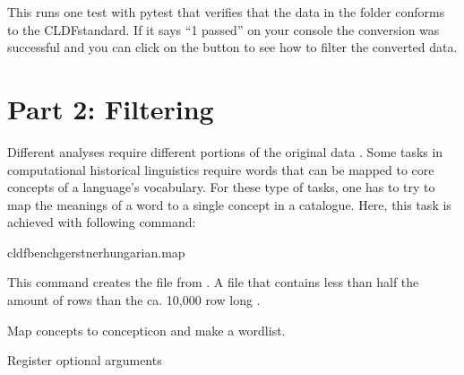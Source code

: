 \documentclass[letterpaper,10pt,english]{sphinxmanual}
\begin{document}
\sphinxAtStartPar
This runs one test with pytest that verifies that the data in the folder
 conforms to the CLDF\sphinxhyphen{}standard. If it says “1 passed” on your console
the conversion was successful and you can click on the  button
to see how to filter the converted data.

\sphinxstepscope


\chapter{Part 2: Filtering}
\label{\detokenize{filter:part-2-filtering}}\label{\detokenize{filter::doc}}
\sphinxAtStartPar
Different analyses require different portions of the original data
. Some tasks in computational historical
linguistics require words that can be mapped to core concepts of a language’s
vocabulary. For these type of tasks, one has to try to map the
meanings of a word to a single concept in a catalogue. Here,
this task is achieved with following command:

\begin{sphinxVerbatim}[commandchars=\\\{\}]
cldfbenchgerstnerhungarian.map
\end{sphinxVerbatim}

\sphinxAtStartPar
This command creates the file  from .
A file that contains less than half the amount of rows than the ca. 10,000
row long .

\label{\detokenize{filter:module-gerstnerhungariancommands.map}}
\sphinxAtStartPar
Map concepts to concepticon and make a wordlist.

\begin{fulllineitems}
\label{\detokenize{filter:gerstnerhungariancommands.map.register}}
\pysigstartsignatures
{}
\pysigstopsignatures
\sphinxAtStartPar
Register optional arguments

\end{fulllineitems}
\end{document}
